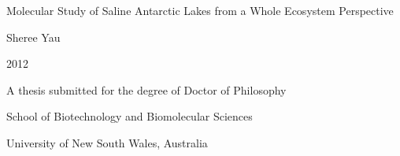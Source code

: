\documentclass[11pt,a4paper,twoside,openright]{report}
\begin{document}

\begin{titlepage}
\begin{center}
\vspace*{1in}
\LARGE{Molecular Study of Saline Antarctic Lakes from a Whole Ecosystem Perspective}
\par
\vspace{1.5in}
\large{Sheree Yau}
\par
\vspace{0.5in}
\large{2012}
\par
\vfill
A thesis submitted for the degree of Doctor of Philosophy
\par
\vspace{0.5in}
School of Biotechnology and Biomolecular Sciences
\par
University of New South Wales, Australia
\par
\vspace{0.5in}
\end{center}
\end{titlepage}







\tableofcontents
\listoffigures
\listoftables


















\end{document}
